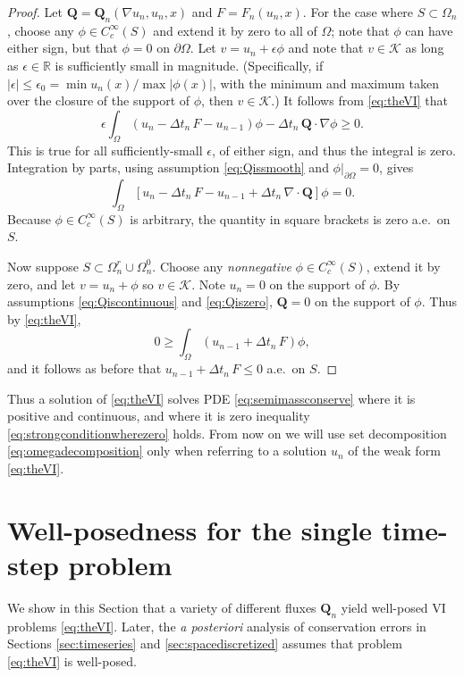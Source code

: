 \documentclass[final,onefignum]{siamart190516}
\newcommand\bQ{\mathbf{Q}}
\newcommand{\Div}{\nabla\cdot}
\newcommand\eps{\epsilon}
\newcommand{\grad}{\nabla}
\newcommand\RR{\mathbb{R}}
\begin{document}
\begin{proof}  Let $\bQ = \bQ_n(\grad u_n,u_n,x)$ and $F=F_n(u_n,x)$.  For the case where $S \subset \Omega_n$, choose any $\phi\in C_c^\infty(S)$ and extend it by zero to all of $\Omega$; note that $\phi$ can have either sign, but that $\phi=0$ on $\partial\Omega$.  Let $v = u_n + \eps \phi$ and note that $v \in \mathcal{K}$ as long as $\eps\in\RR$ is sufficiently small in magnitude.  (Specifically, if $|\eps|\le \eps_0 = \min u_n(x) / \max |\phi(x)|$, with the minimum and maximum taken over the closure of the support of $\phi$, then $v \in \mathcal{K}$.)  It follows from \eqref{eq:theVI} that
   $$\eps \int_\Omega \left(u_n - \Delta t_n\,F - u_{n-1}\right)\phi - \Delta t_n\,\bQ \cdot \grad \phi \ge 0.$$
This is true for all sufficiently-small $\eps$, of either sign, and thus the integral is zero.  Integration by parts, using assumption \eqref{eq:Qissmooth} and $\phi\big|_{\partial\Omega}=0$, gives
   $$\int_\Omega \left[ u_n - \Delta t_n\,F - u_{n-1} + \Delta t_n\,\Div\bQ \right]\phi = 0.$$
Because $\phi\in C_c^\infty(S)$ is arbitrary, the quantity in square brackets is zero a.e.~on $S$.

Now suppose $S \subset \Omega_n^r \cup \Omega_n^0$.  Choose any \emph{nonnegative} $\phi\in C_c^\infty(S)$, extend it by zero, and let $v = u_n + \phi$ so $v\in\mathcal{K}$.  Note $u_n=0$ on the support of $\phi$.  By assumptions \eqref{eq:Qiscontinuous} and \eqref{eq:Qiszero}, $\bQ=0$ on the support of $\phi$.  Thus by \eqref{eq:theVI},
    $$0 \ge \int_{\Omega} \left(u_{n-1} + \Delta t_n\, F\right) \phi,$$
and it follows as before that $u_{n-1} + \Delta t_n\, F \le 0$ a.e.~on $S$. \end{proof}

Thus a solution of \eqref{eq:theVI} solves PDE \eqref{eq:semimassconserve} where it is positive and continuous, and where it is zero inequality \eqref{eq:strongconditionwherezero} holds.  From now on we will use set decomposition \eqref{eq:omegadecomposition} only when referring to a solution $u_n$ of the weak form \eqref{eq:theVI}.


\section{Well-posedness for the single time-step problem} \label{sec:wellposed}

We show in this Section that a variety of different fluxes $\bQ_n$ yield well-posed VI problems \eqref{eq:theVI}.  Later, the \emph{a posteriori} analysis of conservation errors in Sections \ref{sec:timeseries} and \ref{sec:spacediscretized} assumes that problem \eqref{eq:theVI} is well-posed.
\end{document}
